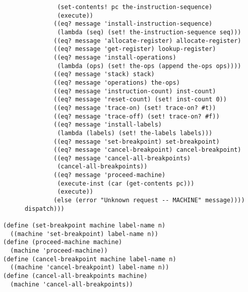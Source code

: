 \documentclass[a4paper,12pt]{article}
\begin{document}
\begin{lstlisting}
               (set-contents! pc the-instruction-sequence)
               (execute))
              ((eq? message 'install-instruction-sequence)
               (lambda (seq) (set! the-instruction-sequence seq)))
              ((eq? message 'allocate-register) allocate-register)
              ((eq? message 'get-register) lookup-register)
              ((eq? message 'install-operations)
               (lambda (ops) (set! the-ops (append the-ops ops))))
              ((eq? message 'stack) stack)
              ((eq? message 'operations) the-ops)
              ((eq? message 'instruction-count) inst-count)
              ((eq? message 'reset-count) (set! inst-count 0))
              ((eq? message 'trace-on) (set! trace-on? #t))
              ((eq? message 'trace-off) (set! trace-on? #f))
              ((eq? message 'install-labels)
               (lambda (labels) (set! the-labels labels)))
              ((eq? message 'set-breakpoint) set-breakpoint)
              ((eq? message 'cancel-breakpoint) cancel-breakpoint)
              ((eq? message 'cancel-all-breakpoints)
               (cancel-all-breakpoints))
              ((eq? message 'proceed-machine)
               (execute-inst (car (get-contents pc)))
               (execute))
              (else (error "Unknown request -- MACHINE" message))))
      dispatch)))

(define (set-breakpoint machine label-name n)
  ((machine 'set-breakpoint) label-name n))
(define (proceed-machine machine)
  (machine 'proceed-machine))
(define (cancel-breakpoint machine label-name n)
  ((machine 'cancel-breakpoint) label-name n))
(define (cancel-all-breakpoints machine)
  (machine 'cancel-all-breakpoints))
\end{lstlisting}
\end{document}
